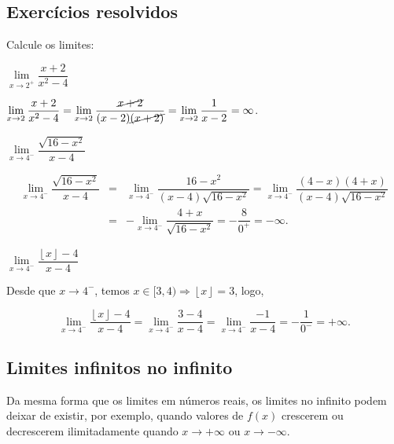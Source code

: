 \cleardoublepage\documentclass[../main.tex]{subfiles}
\begin{document}
\subsection{Exercícios resolvidos}
\begin{exeresol}
  Calcule os limites:\\
  \begin{compactenum}[a)]
  \item \(\lim\limits_{x \to 2^{+}} \dfrac{x+2}{x^2-4}\)\\
    \begin{resol}
  \(\lim\limits_{x \to 2^{}} \dfrac{x+2}{x^2-4}=\lim\limits_{x \to 2^{}} \dfrac{\cancel{x+2}}{(x-2)\cancel{(x+2)}}=\lim\limits_{x \to 2^{}} \dfrac{1}{x-2}=\infty\).
\end{resol}
\item  \(\lim\limits_{x \to 4^{-}} \dfrac{\sqrt{16-x^2}}{x-4}\)\\
  \begin{resol}
    \[ \begin{array}{rcl} \lim\limits_{x \to 4^{-}} \dfrac{\sqrt{16-x^2}}{x-4} & = & \lim\limits_{x \to 4^{-}} \dfrac{16-x^2}{(x-4)\sqrt{16-x^2}} = \lim\limits_{x \to 4^{-}} \dfrac{(4-x)(4+x)}{(x-4)\sqrt{16-x^2}}\\ &=& -\lim\limits_{x \to 4^{-}} \dfrac{4+x}{\sqrt{16-x^2}} =-\dfrac{8}{0^{+}}=-\infty. \end{array} \]
  \end{resol}
  \item \(\lim\limits_{x \to 4^{-}} \dfrac{\left\lfloor x\right\rfloor-4}{x-4}\)\\
  \begin{resol}
  Desde que \(x \to 4^{-}\), temos \(x\in [3,4)\Rightarrow \left\lfloor x\right\rfloor =3\), logo,

\[ \lim\limits_{x \to 4^{-}} \dfrac{\left\lfloor x\right\rfloor-4}{x-4}= \lim\limits_{x \to 4^{-}} \dfrac{3-4}{x-4} =\lim\limits_{x \to 4^{-}} \dfrac{-1}{x-4} = -\dfrac{1}{0^{-}}=+\infty. \]
  \end{resol}
  \end{compactenum}
\end{exeresol}
\subsection{Limites infinitos no infinito}
Da mesma forma que os limites em números reais, os limites no infinito podem deixar de existir, por exemplo, quando valores de \(f(x)\) crescerem ou decrescerem ilimitadamente quando \({x \to +\infty}\) ou \({x \to -\infty}\). 
\end{document}
